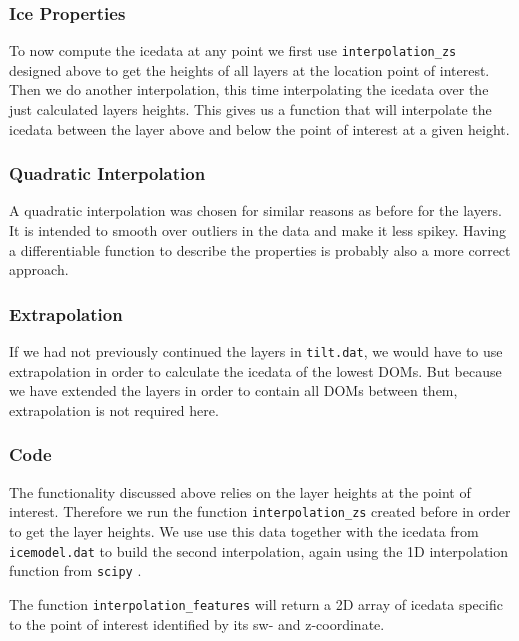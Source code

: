 \documentclass[a4paper,10pt]{scrartcl}
\begin{document}
\subsubsection{Ice Properties}

To now compute the icedata at any point we first use \texttt{interpolation\_zs} designed above to get the heights of all layers at the location point of interest.
Then we do another interpolation, this time interpolating the icedata over the just calculated layers heights.
This gives us a function that will interpolate the icedata between the layer above and below the point of interest at a given height.

\subsubsection*{Quadratic Interpolation}

A quadratic interpolation was chosen for similar reasons as before for the layers.
It is intended to smooth over outliers in the data and make it less spikey.
Having a differentiable function to describe the properties is probably also a more correct approach.

\subsubsection*{Extrapolation}

If we had not previously continued the layers in \texttt{tilt.dat}, we would have to use extrapolation in order to calculate the icedata of the lowest DOMs.
But because we have extended the layers in order to contain all DOMs between them, extrapolation is not required here.

\subsubsection*{Code}

The functionality discussed above relies on the layer heights at the point of interest.
Therefore we run the function \texttt{interpolation\_zs} created before in order to get the layer heights.
We use use this data together with the icedata from \texttt{icemodel.dat} to build the second interpolation, again using the 1D interpolation function from \texttt{scipy} \cite{scipy}.

The function \texttt{interpolation\_features} will return a 2D array of icedata specific to the point of interest identified by its sw- and z-coordinate.
\end{document}
